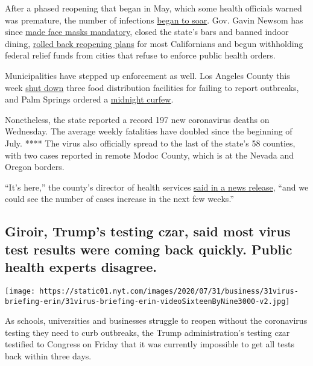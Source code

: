 After a phased reopening that began in May, which some health officials
warned was premature, the number of infections
\href{https://www.nytimes.com/2020/06/29/us/california-coronavirus-reopening.html}{began
to soar}. Gov. Gavin Newsom has since
\href{https://www.nytimes.com/interactive/2020/07/17/upshot/coronavirus-face-mask-map.html}{made
face masks mandatory}, closed the state's bars and banned indoor dining,
\href{https://www.nytimes.com/2020/07/14/us/california-counties-reopening.html}{rolled
back reopening plans} for most Californians and begun withholding
federal relief funds from cities that refuse to enforce public health
orders.

Municipalities have stepped up enforcement as well. Los Angeles County
this week
\href{https://www.latimes.com/california/story/2020-07-29/county-shuts-three-businesses-for-failing-to-report-coronavirus-outbreaks}{shut
down} three food distribution facilities for failing to report
outbreaks, and Palm Springs ordered a
\href{https://www.palmspringsca.gov/home/showdocument?id=75670}{midnight
curfew}.

Nonetheless, the state reported a record 197 new coronavirus deaths on
Wednesday. The average weekly fatalities have doubled since the
beginning of July. **** The virus also officially spread to the last of
the state's 58 counties, with two cases reported in remote Modoc County,
which is at the Nevada and Oregon borders.

``It's here,'' the county's director of health services
\href{http://modochealthservices.org/corona-virus}{said in a news
release}, ``and we could see the number of cases increase in the next
few weeks.''

\hypertarget{giroir-trumps-testing-czar-said-most-virus-test-results-were-coming-back-quickly-public-health-experts-disagree}{%
\subsection{Giroir, Trump's testing czar, said most virus test results
were coming back quickly. Public health experts
disagree.}\label{giroir-trumps-testing-czar-said-most-virus-test-results-were-coming-back-quickly-public-health-experts-disagree}}

\texttt{[image: https://static01.nyt.com/images/2020/07/31/business/31virus-briefing-erin/31virus-briefing-erin-videoSixteenByNine3000-v2.jpg]}

As schools, universities and businesses struggle to reopen without the
coronavirus testing they need to curb outbreaks, the Trump
administration's testing czar testified to Congress on Friday that it
was currently impossible to get all tests back within three days.

